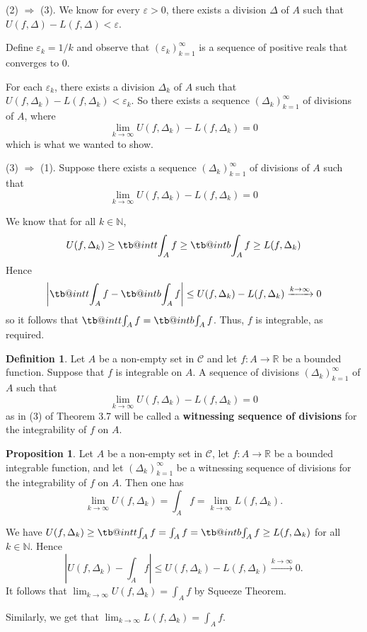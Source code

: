 \documentclass[11pt]{article}
\makeatletter
\theoremstyle{definition}
\newtheorem{defn}[thm]{Definition}
\newtheorem{prop}[thm]{Proposition}
\newcommand{\N}{\ensuremath{\mathbb{N}}}
\newcommand{\R}{\ensuremath{\mathbb{R}}}
\newcommand\tint{\mathop{\mathpalette\tb@int{t}}\!\int}
\newcommand\bint{\mathop{\mathpalette\tb@int{b}}\!\int}
\newcommand\tb@int[2]{%
  \sbox\z@{$\m@th#1\int$}%
  \if#2t%
    \rlap{\hbox to\wd\z@{%
      \hfil
      \vrule width .35em height \dimexpr\ht\z@+1.4pt\relax depth -\dimexpr\ht\z@+1pt\relax
      \kern.05em %
    }}
  \else
    \rlap{\hbox to\wd\z@{%
      \vrule width .35em height -\dimexpr\dp\z@+1pt\relax depth \dimexpr\dp\z@+1.4pt\relax
      \hfil
    }}
  \fi
}
\newenvironment{pf}[1][\proofname]{\par
  \pushQED{\qed}%
  \normalfont \topsep0\p@\relax
  \trivlist
  \item[\hskip\labelsep\itshape
  #1\@addpunct{.}]\ignorespaces
}{%
  \popQED\endtrivlist\@endpefalse
}
\makeatother
\begin{document}
\begin{pf}
(2) $\Rightarrow$ (3). We know for every $\varepsilon > 0$, there exists a division $\Delta$ of $A$ such that $U(f, \Delta) - L(f, \Delta) < \varepsilon$. 

Define $\varepsilon_k = 1/k$ and observe that $(\varepsilon_k)_{k=1}^\infty$ is a sequence of positive reals that converges to 0.

For each $\varepsilon_k$, there exists a division $\Delta_k$ of $A$ such that $U(f, \Delta_k) - L(f, \Delta_k) < \varepsilon_k$. So there exists a sequence $(\Delta_k)_{k=1}^\infty$ of divisions of $A$, where
$$\lim_{k\to\infty} U(f, \Delta_k) - L(f, \Delta_k) = 0$$
which is what we wanted to show.

(3) $\Rightarrow$ (1). Suppose there exists a sequence $(\Delta_k)_{k=1}^\infty$ of divisions of $A$ such that $$\lim_{k\to\infty} U(f, \Delta_k) - L(f, \Delta_k) = 0$$ 

We know that for all $k \in \N$, 
$$U(f, \Delta_k) \geq \tint_A f \geq \bint_A f \geq L(f, \Delta_k)$$
Hence
$$\left| \tint_A f - \bint_A f \right| \leq U(f, \Delta_k) - L(f, \Delta_k) \xrightarrow[]{k\to\infty} 0$$
so it follows that $\tint_A f = \bint_A f$. Thus, $f$ is integrable, as required.
\end{pf}

\begin{defn}
Let $A$ be a non-empty set in $\mathcal{C}$ and let $f : A \to \R$ be a bounded function. Suppose that $f$ is integrable on $A$. A sequence of divisions $(\Delta_k)_{k=1}^\infty$ of $A$ such that
$$\lim_{k\to\infty} U(f, \Delta_k) - L(f, \Delta_k) = 0$$
as in (3) of Theorem 3.7 will be called a {\bf witnessing sequence of divisions} for the integrability of $f$ on $A$.
\end{defn}

\begin{prop}
Let $A$ be a non-empty set in $\mathcal{C}$, let $f : A \to \R$ be a bounded integrable function, and let $(\Delta_k)_{k=1}^\infty$ be a witnessing sequence of divisions for the integrability of $f$ on $A$. Then one has 
$$\lim_{k\to\infty} U(f, \Delta_k) = \int_A f = \lim_{k\to\infty} L(f, \Delta_k).$$
\end{prop}
\begin{pf}
We have $U(f, \Delta_k) \geq \tint_A f = \int_A f = \bint_A f \geq L(f, \Delta_k)$ for all $k \in \N$. Hence 
$$\left|U(f, \Delta_k) - \int_A f\right| \leq U(f, \Delta_k) - L(f, \Delta_k) \xrightarrow[]{k\to\infty} 0.$$
It follows that $\lim_{k\to\infty} U(f, \Delta_k) = \int_A f$ by Squeeze Theorem.

Similarly, we get that $\lim_{k\to\infty} L(f, \Delta_k) = \int_A f$.
\end{pf}
\end{document}
